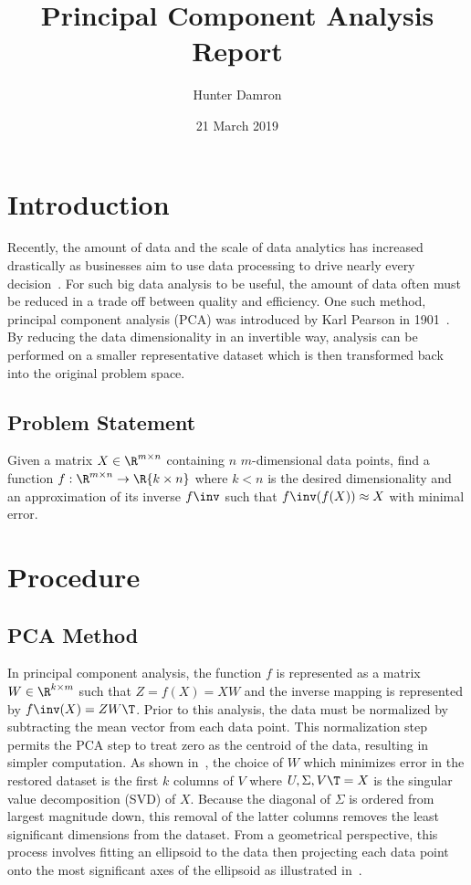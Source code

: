 \documentclass{article}
\title{Principal Component Analysis Report}
\author{Hunter Damron}
\date{21 March 2019}
\begin{document}
	\maketitle


	\section{Introduction}
		Recently, the amount of data and the scale of data analytics has increased drastically as businesses aim to use data processing to drive nearly every decision~\cite{bigdata}. For such big data analysis to be useful, the amount of data often must be reduced in a trade off between quality and efficiency. One such method, principal component analysis (PCA) was introduced by Karl Pearson in 1901~\cite{pearson}. By reducing the data dimensionality in an invertible way, analysis can be performed on a smaller representative dataset which is then transformed back into the original problem space.

	\subsection{Problem Statement}
		Given a matrix $X \in \R^{m \times n}$ containing $n$ $m$-dimensional data points, find a function $f : \R^{m \times n} \to \R{k \times n}$ where $k < n$ is the desired dimensionality and an approximation of its inverse $f\inv$ such that $f\inv (f(X)) \approx X$ with minimal error.

	\section{Procedure}
	\subsection{PCA Method}
		In principal component analysis, the function $f$ is represented as a matrix $W \in \R^{k \times m}$ such that $Z = f(X) = XW$ and the inverse mapping is represented by $f\inv(X) = ZW\T$. Prior to this analysis, the data must be normalized by subtracting the mean vector from each data point. This normalization step permits the PCA step to treat zero as the centroid of the data, resulting in simpler computation. As shown in~\cite{notes}, the choice of $W$ which minimizes error in the restored dataset is the first $k$ columns of $V$ where $U, \Sigma, V\T = X$ is the singular value decomposition (SVD) of $X$. Because the diagonal of $\Sigma$ is ordered from largest magnitude down, this removal of the latter columns removes the least significant dimensions from the dataset. From a geometrical perspective, this process involves fitting an ellipsoid to the data then projecting each data point onto the most significant axes of the ellipsoid as illustrated in~\cite{pearson}.
\end{document}
